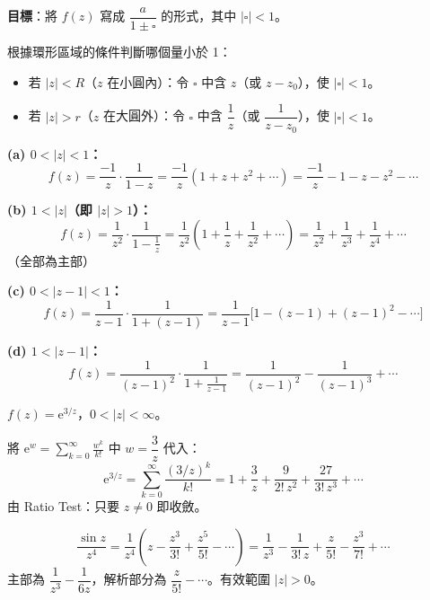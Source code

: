 \documentclass[12pt,a4paper]{article}
\newcommand{\ee}{\mathrm{e}}
\begin{document}
\begin{keybox}
\textbf{目標}：將 $f(z)$ 寫成 $\dfrac{a}{1\pm\square}$ 的形式，其中 $|\square|<1$。

根據環形區域的條件判斷哪個量小於 1：
\begin{itemize}[nosep]
\item 若 $|z|<R$（$z$ 在小圓內）：令 $\square$ 中含 $z$（或 $z-z_0$），使 $|\square|<1$。
\item 若 $|z|>r$（$z$ 在大圓外）：令 $\square$ 中含 $\dfrac{1}{z}$（或 $\dfrac{1}{z-z_0}$），使 $|\square|<1$。
\end{itemize}
\end{keybox}

\begin{exbox}[經典範例：$f(z)=\dfrac{1}{z(z-1)}$ 的四種 Laurent 展開]
\textbf{(a) $0<|z|<1$：}
$$f(z)=\frac{-1}{z}\cdot\frac{1}{1-z}=\frac{-1}{z}(1+z+z^2+\cdots)=\frac{-1}{z}-1-z-z^2-\cdots$$

\textbf{(b) $1<|z|$（即 $|z|>1$）：}
$$f(z)=\frac{1}{z^2}\cdot\frac{1}{1-\frac{1}{z}}=\frac{1}{z^2}\left(1+\frac{1}{z}+\frac{1}{z^2}+\cdots\right)=\frac{1}{z^2}+\frac{1}{z^3}+\frac{1}{z^4}+\cdots$$
（全部為主部）

\textbf{(c) $0<|z-1|<1$：}
$$f(z)=\frac{1}{z-1}\cdot\frac{1}{1+(z-1)}=\frac{1}{z-1}\bigl[1-(z-1)+(z-1)^2-\cdots\bigr]$$

\textbf{(d) $1<|z-1|$：}
$$f(z)=\frac{1}{(z-1)^2}\cdot\frac{1}{1+\frac{1}{z-1}}=\frac{1}{(z-1)^2}-\frac{1}{(z-1)^3}+\cdots$$
\end{exbox}

\begin{exbox}
$f(z)=\ee^{3/z}$，$0<|z|<\infty$。

將 $\ee^w=\displaystyle\sum_{k=0}^{\infty}\frac{w^k}{k!}$ 中 $w=\dfrac{3}{z}$ 代入：
$$\ee^{3/z}=\sum_{k=0}^{\infty}\frac{(3/z)^k}{k!}=1+\frac{3}{z}+\frac{9}{2!\,z^2}+\frac{27}{3!\,z^3}+\cdots$$
由 Ratio Test：只要 $z\ne 0$ 即收斂。
\end{exbox}

\begin{exbox}
$$\frac{\sin z}{z^4}=\frac{1}{z^4}\left(z-\frac{z^3}{3!}+\frac{z^5}{5!}-\cdots\right)=\frac{1}{z^3}-\frac{1}{3!\,z}+\frac{z}{5!}-\frac{z^3}{7!}+\cdots$$
主部為 $\dfrac{1}{z^3}-\dfrac{1}{6z}$，解析部分為 $\dfrac{z}{5!}-\cdots$。有效範圍 $|z|>0$。
\end{exbox}

\newpage
\end{document}
